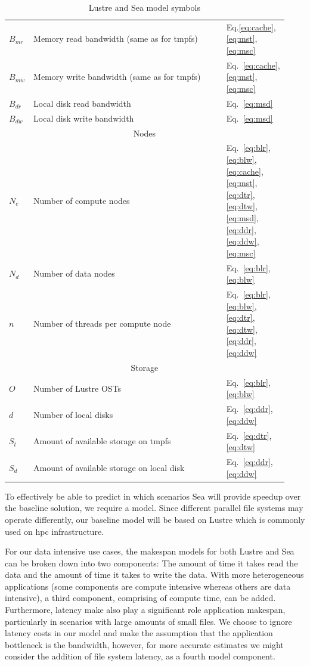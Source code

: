 \documentclass{report}
\begin{document}
\begin{table}[h!]
\begin{tabular}{|p{0.03\linewidth}|p{0.7\linewidth}|p{0.2\linewidth}|}
     $B_{mr}$ & Memory read bandwidth (same as for tmpfs) & Eq.\ref{eq:cache}, \ref{eq:mst}, \ref{eq:msc}\\
     $B_{mw}$ & Memory write bandwidth (same as for tmpfs) & Eq.~\ref{eq:cache}, \ref{eq:mst}, \ref{eq:msc}\\
     $B_{dr}$ & Local disk read bandwidth & Eq.~\ref{eq:msd}\\
     $B_{dw}$ & Local disk write bandwidth & Eq.~\ref{eq:msd}\\
     \hline
     \multicolumn{3}{|c|}{Nodes} \\
     \hline
     $N_{c}$ & Number of compute nodes & Eq.~\ref{eq:blr}, \ref{eq:blw}, \ref{eq:cache}, \ref{eq:mst}, \ref{eq:dtr}, \ref{eq:dtw}, \ref{eq:msd}, \ref{eq:ddr}, \ref{eq:ddw}, \ref{eq:msc}\\
     $N_{d}$ & Number of data nodes & Eq.~\ref{eq:blr}, \ref{eq:blw}\\
     $n$ & Number of threads per compute node & Eq.~\ref{eq:blr}, \ref{eq:blw}, \ref{eq:dtr}, \ref{eq:dtw}, \ref{eq:ddr}, \ref{eq:ddw}\\
     \hline
     \multicolumn{3}{|c|}{Storage} \\
     \hline
     $O$ & Number of Lustre OSTs & Eq.~\ref{eq:blr}, \ref{eq:blw}\\
     $d$ & Number of local disks & Eq.~\ref{eq:ddr}, \ref{eq:ddw}\\
     $S_{t}$ & Amount of available storage on tmpfs & Eq.~\ref{eq:dtr}, \ref{eq:dtw} \\
     $S_{d}$ & Amount of available storage on local disk & Eq.~\ref{eq:ddr}, \ref{eq:ddw} \\
     \hline
    \end{tabular}
    \caption{Lustre and Sea model symbols}
    \label{table:1}
    \end{table}

    To effectively be able to predict in which scenarios Sea will provide speedup
    over the baseline solution, we require a model. Since different parallel file
    systems may operate differently, our baseline model will be based on Lustre which
    is commonly used on \gls{hpc} infrastructure.

    For our data intensive use cases, the makespan models for both Lustre and Sea can be broken
    down into two components: The amount of time it takes read the data and the amount
    of time it takes to write the data. With more heterogeneous applications (some components 
    are compute intensive whereas others are data intensive), a third component, comprising
    of compute time, can be added. Furthermore, latency make also play a significant role
    application makespan, particularly in scenarios with large amounts of small files.
    We choose to ignore latency costs in our model and make the assumption that the
    application bottleneck is the bandwidth, however, for more accurate estimates we
    might consider the addition of file system latency, as a fourth model component.
\end{document}

